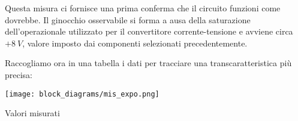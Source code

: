 Questa misura ci fornisce una prima conferma che il circuito funzioni come dovrebbe. Il
ginocchio osservabile si forma a ausa della saturazione dell'operazionale utilizzato per il
convertitore corrente-tensione e avviene circa $+8\ V$, valore imposto dai componenti selezionati
precedentemente.

Raccogliamo ora in una tabella i dati per tracciare una transcaratteristica più precisa:

\begin{minipage}{0.49\textwidth}
    \centering
    \texttt{[image: block\_diagrams/mis\_expo.png]}
    \label{mis_expo}
\end{minipage}
\begin{minipage}{0.49\textwidth}
    \centering
    \begin{table}[H]
        \centering
        \caption{Valori misurati}
        \label{expo_table}
    \end{table}
\end{minipage}

